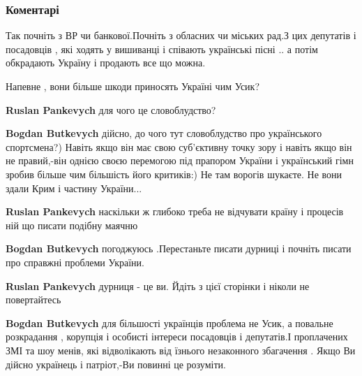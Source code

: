 
 
 
 
 
\subsubsection{Коментарі}
\label{sec:26_09_2021.fb.butkevich_bogdan.1.usik_pirrova_pobeda.cmt}

\begin{itemize} %

Так почніть з ВР чи банкової.Почніть з обласних чи міських рад.З цих депутатів
і посадовців , які ходять у вишиванці і співають українські пісні .. а потім
обкрадають Україну і продають все що можна.

Напевне , вони більше шкоди приносять Україні чим Усик?

\begin{itemize} %
\textbf{Ruslan Pankevych} для чого це словоблудство?

\textbf{Bogdan Butkevych} дійсно, до чого тут словоблудство про українського спортсмена?)
Навіть якщо він має свою суб’єктивну точку зору і навіть якщо він не правий,-він однією своєю перемогою під прапором України і український гімн зробив більше чим більшість його критиків:)
Не там ворогів шукаєте. Не вони здали Крим і частину України...


\textbf{Ruslan Pankevych} наскільки ж глибоко треба не відчувати країну і процесів ній що писати подібну маячню

\textbf{Bogdan Butkevych} погоджуюсь .Перестаньте писати дурниці і почніть писати про справжні проблеми України.


\textbf{Ruslan Pankevych} дурниця - це ви. Йдіть з цієї сторінки і ніколи не повертайтесь

\textbf{Bogdan Butkevych} для більшості українців проблема не Усик, а повальне розкрадання , корупція і особисті інтереси посадовців і депутатів.І проплачених ЗМІ та шоу менів, які відволікають від їзнього незаконного збагачення .
Якщо Ви дійсно українець і патріот,-Ви повинні це розуміти.



\end{itemize}
\end{itemize}

